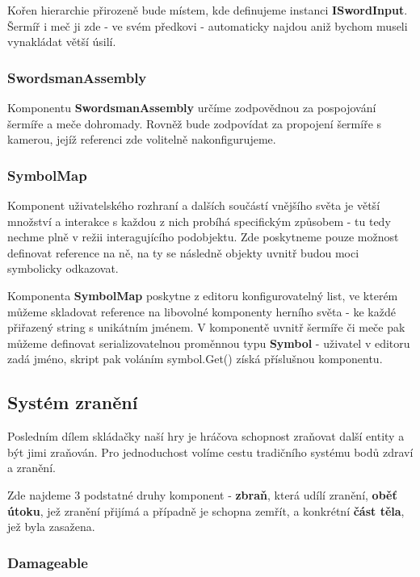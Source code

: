 Kořen hierarchie přirozeně bude místem, kde definujeme instanci \textbf{ISwordInput}. Šermíř i meč ji zde - ve svém předkovi - automaticky najdou aniž bychom museli vynakládat větší úsilí.

\subsubsection*{SwordsmanAssembly}

Komponentu \textbf{SwordsmanAssembly} určíme zodpovědnou za pospojování šermíře a meče dohromady. Rovněž bude zodpovídat za propojení šermíře s kamerou, jejíž referenci zde volitelně nakonfigurujeme. 

\subsubsection*{SymbolMap}

Komponent uživatelského rozhraní a dalších součástí vnějšího světa je větší množství a interakce s každou z nich probíhá specifickým způsobem - tu tedy nechme plně v režii interagujícího podobjektu. Zde poskytneme pouze možnost definovat reference na ně, na ty se následně objekty uvnitř budou moci symbolicky odkazovat.

Komponenta \textbf{SymbolMap} poskytne z editoru konfigurovatelný list, ve kterém můžeme skladovat reference na libovolné komponenty herního světa - ke každé přiřazený string s unikátním jménem. V komponentě uvnitř šermíře či meče pak můžeme definovat serializovatelnou proměnnou typu \textbf{Symbol} - uživatel v editoru zadá jméno, skript pak voláním symbol.Get() získá příslušnou komponentu.


\subsection{Systém zranění}

Posledním dílem skládačky naší hry je hráčova schopnost zraňovat další entity a být jimi zraňován. Pro jednoduchost volíme cestu tradičního systému bodů zdraví a zranění.

Zde najdeme 3 podstatné druhy komponent - \textbf{zbraň}, která udílí zranění, \textbf{oběť útoku}, jež zranění přijímá a případně je schopna zemřít, a konkrétní \textbf{část těla}, jež byla zasažena.

\subsubsection*{Damageable}

